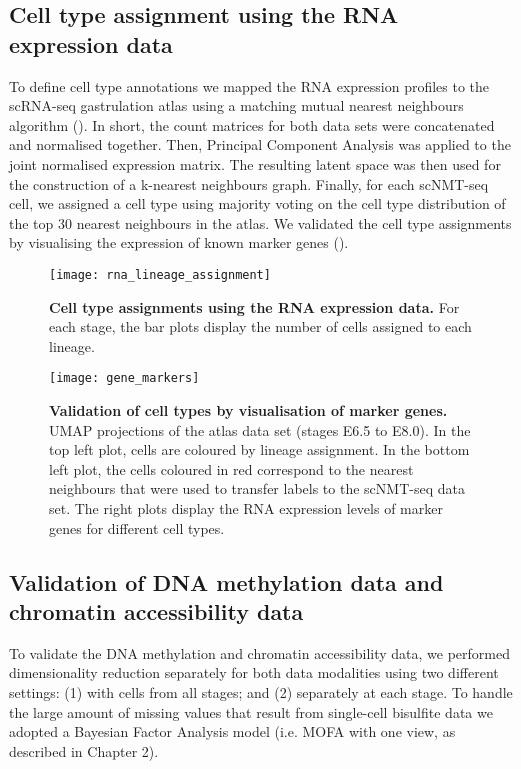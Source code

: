 \subsection{Cell type assignment using the RNA expression data}

To define cell type annotations we mapped the RNA expression profiles to the scRNA-seq gastrulation atlas \cite{Pijuan-Sala2019} using a matching mutual nearest neighbours algorithm \cite{Haghverdi2018} (). In short, the count matrices for both data sets were concatenated and normalised together. Then, Principal Component Analysis was applied to the joint normalised expression matrix. The resulting latent space was then used for the construction of a k-nearest neighbours graph. Finally, for each scNMT-seq cell, we assigned a cell type using majority voting on the cell type distribution of the top 30 nearest neighbours in the atlas. We validated the cell type assignments by visualising the expression of known marker genes ().

\begin{figure}[H]
	\centering
	\texttt{[image: rna\_lineage\_assignment]}
	\caption[]{\textbf{Cell type assignments using the RNA expression data.} For each stage, the bar plots display the number of cells assigned to each lineage.}
	\label{fig:lineage_assignment}
\end{figure}

\begin{figure}[H]
	\centering
	\texttt{[image: gene\_markers]}
	\caption[]{
	\textbf{Validation of cell types by visualisation of marker genes.} \\
	UMAP projections of the atlas data set (stages E6.5 to E8.0). In the top left plot, cells are coloured by lineage assignment. In the bottom left plot, the cells coloured in red correspond to the nearest neighbours that were used to transfer labels to the scNMT-seq data set. The right plots display the RNA expression levels of marker genes for different cell types.
	}
	\label{fig:gene_markers}
\end{figure}


\subsection{Validation of DNA methylation data and chromatin accessibility data}

To validate the DNA methylation and chromatin accessibility data, we performed dimensionality reduction separately for both data modalities using two different settings: (1) with cells from all stages; and (2) separately at each stage. To handle the large amount of missing values that result from single-cell bisulfite data we adopted a Bayesian Factor Analysis model (i.e. MOFA with one view, as described in Chapter 2). 

